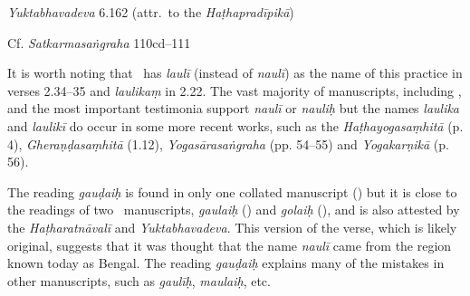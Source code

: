 \begin{ekdosis}
\begin{testimonia}[hp02_034]
\emph{Yuktabhavadeva} 6.162 (attr.~to the \emph{Haṭhapradīpikā})

\begin{versinnote}
\end{versinnote}

Cf. \emph{Satkarmasaṅgraha} 110cd–111

\begin{versinnote}
\end{versinnote}

\end{testimonia}

\begin{philcomm}[hp02_034]
It is worth noting that \alphaOne\ has \emph{laulī} (instead of \emph{naulī}) as the name of this practice in verses 2.34–35 and \emph{laulikaṃ} in 2.22. The vast majority of manuscripts, including \alphaTwo, and the most important testimonia support \emph{naulī} or \emph{nauliḥ} but the names \emph{laulika} and \emph{laulikī} do occur in some more recent works, such as the \emph{Haṭhayogasaṃhitā} (p. 4), \emph{Gheraṇḍasaṃhitā} (1.12), \emph{Yogasārasaṅgraha} (pp. 54–55) and \emph{Yogakarṇikā} (p. 56). 


The reading \emph{gauḍaiḥ} is found in only one collated manuscript (\etaTwo) but it is close to the readings of two \textalpha\ manuscripts, \emph{gaulaiḥ} (\alphaOne) and \emph{golaiḥ} (\alphaThree), and is also attested by the \emph{Haṭharatnāvalī} and \emph{Yuktabhavadeva}. This version of the verse, which is likely original, suggests that it was thought that the name \emph{naulī} came from the region known today as Bengal. The reading \emph{gauḍaiḥ} explains many of the mistakes in other manuscripts, such as \emph{gaulīḥ}, \emph{maulaiḥ}, etc.
\end{philcomm}


\end{ekdosis}
